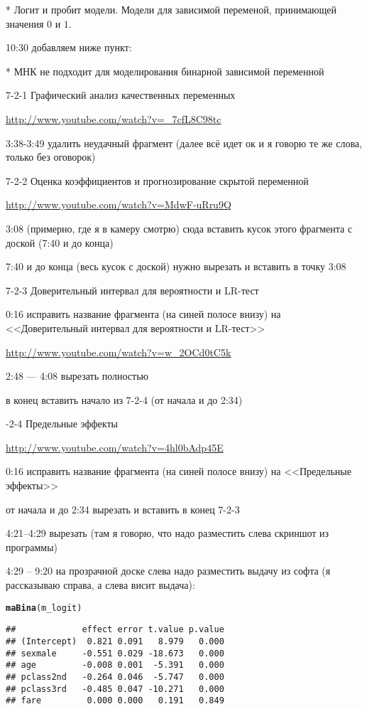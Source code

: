 \documentclass[12pt,a4paper]{article}\usepackage[]{graphicx}\usepackage[]{color}
\makeatletter
\newcommand{\hlstd}[1]{\textcolor[rgb]{0.345,0.345,0.345}{#1}}%
\newcommand{\hlkwd}[1]{\textcolor[rgb]{0.737,0.353,0.396}{\textbf{#1}}}%
\newenvironment{kframe}{%
 \def\at@end@of@kframe{}%
 \ifinner\ifhmode%
  \def\at@end@of@kframe{\end{minipage}}%
  \begin{minipage}{\columnwidth}%
 \fi\fi%
 \def\FrameCommand##1{\hskip\@totalleftmargin \hskip-\fboxsep
 \colorbox{shadecolor}{##1}\hskip-\fboxsep
     \hskip-\linewidth \hskip-\@totalleftmargin \hskip\columnwidth}%
 \MakeFramed {\advance\hsize-\width
   \@totalleftmargin\z@ \linewidth\hsize
   \@setminipage}}%
 {\par\unskip\endMakeFramed%
 \at@end@of@kframe}
\newenvironment{knitrout}{}{} %
\makeatother
\begin{document}
* Логит и пробит модели. Модели для зависимой переменой, принимающей значения $0$ и $1$.

10:30 добавляем ниже пункт:

* МНК не подходит для моделирования бинарной зависимой переменной

7-2-1 Графический анализ качественных переменных

\url{http://www.youtube.com/watch?v=_7cfL8C98tc}

3:38-3:49 удалить неудачный фрагмент (далее всё идет ок и я говорю те же слова, только без оговорок)


7-2-2 Оценка коэффициентов и прогнозирование скрытой переменной

\url{http://www.youtube.com/watch?v=MdwF-uRru9Q}

3:08 (примерно, где я в камеру смотрю) сюда вставить кусок этого фрагмента с доской (7:40 и до конца)

7:40 и до конца (весь кусок с доской) нужно вырезать и вставить в точку 3:08

7-2-3 Доверительный интервал для вероятности и LR-тест

0:16 исправить название фрагмента (на синей полосе внизу) на <<Доверительный интервал для вероятности и LR-тест>>

\url{http://www.youtube.com/watch?v=w_2OCd0tC5k}

2:48 --- 4:08 вырезать полностью

в конец вставить начало из 7-2-4 (от начала и до 2:34)

-2-4 Предельные эффекты

\url{http://www.youtube.com/watch?v=4hl0bAdp45E}

0:16 исправить название фрагмента (на синей полосе внизу) на <<Предельные эффекты>>

от начала и до 2:34 вырезать и вставить в конец 7-2-3


4:21--4:29 вырезать (там я говорю, что надо разместить слева скриншот из программы)

4:29 -- 9:20 на прозрачной доске слева надо разместить выдачу из софта (я рассказываю справа, а слева висит выдача):




\begin{knitrout}
\color{fgcolor}\begin{kframe}
\begin{alltt}
\hlkwd{maBina}\hlstd{(m_logit)}
\end{alltt}
\begin{verbatim}
##             effect error t.value p.value
## (Intercept)  0.821 0.091   8.979   0.000
## sexmale     -0.551 0.029 -18.673   0.000
## age         -0.008 0.001  -5.391   0.000
## pclass2nd   -0.264 0.046  -5.747   0.000
## pclass3rd   -0.485 0.047 -10.271   0.000
## fare         0.000 0.000   0.191   0.849
\end{verbatim}
\end{kframe}
\end{knitrout}
\end{document}
